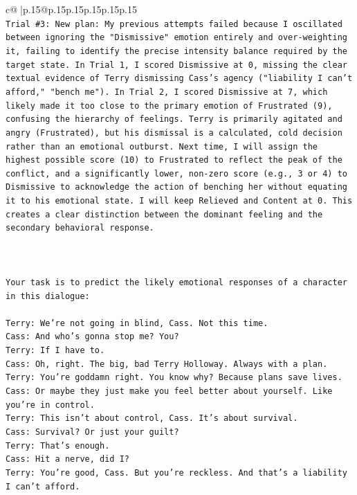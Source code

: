 \documentclass{article}
\begin{document}
{\begin{supertabular}{c@{$\;$}|p{.15\linewidth}@{}p{.15\linewidth}p{.15\linewidth}p{.15\linewidth}p{.15\linewidth}p{.15\linewidth}}
{{{\\ 
\texttt{Trial \#3: New plan: My previous attempts failed because I oscillated between ignoring the "Dismissive" emotion entirely and over{-}weighting it, failing to identify the precise intensity balance required by the target state. In Trial 1, I scored Dismissive at 0, missing the clear textual evidence of Terry dismissing Cass's agency ("liability I can't afford," "bench me"). In Trial 2, I scored Dismissive at 7, which likely made it too close to the primary emotion of Frustrated (9), confusing the hierarchy of feelings. Terry is primarily agitated and angry (Frustrated), but his dismissal is a calculated, cold decision rather than an emotional outburst. Next time, I will assign the highest possible score (10) to Frustrated to reflect the peak of the conflict, and a significantly lower, non{-}zero score (e.g., 3 or 4) to Dismissive to acknowledge the action of benching her without equating it to his emotional state. I will keep Relieved and Content at 0. This creates a clear distinction between the dominant feeling and the secondary behavioral response.} \\
\\ 
\\ 
\\ 
\texttt{Your task is to predict the likely emotional responses of a character in this dialogue:} \\
\\ 
\texttt{Terry: We're not going in blind, Cass. Not this time.} \\
\texttt{Cass: And who's gonna stop me? You?} \\
\texttt{Terry: If I have to. } \\
\texttt{Cass: Oh, right. The big, bad Terry Holloway. Always with a plan. } \\
\texttt{Terry: You're goddamn right. You know why? Because plans save lives.} \\
\texttt{Cass: Or maybe they just make you feel better about yourself. Like you're in control.} \\
\texttt{Terry: This isn't about control, Cass. It's about survival. } \\
\texttt{Cass: Survival? Or just your guilt?} \\
\texttt{Terry: That's enough.} \\
\texttt{Cass: Hit a nerve, did I? } \\
\texttt{Terry: You're good, Cass. But you're reckless. And that's a liability I can't afford.} \\
}}}
\end{supertabular}}
\end{document}
